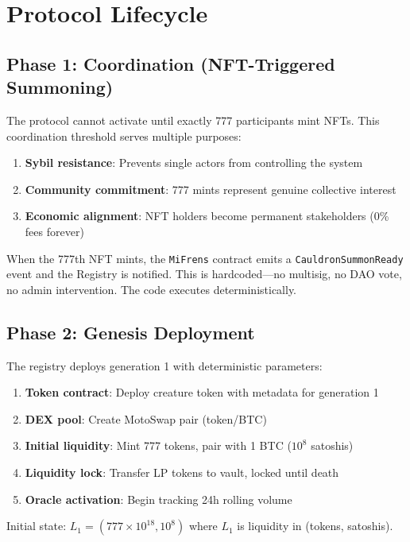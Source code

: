 \documentclass[11pt,a4paper]{article}
\begin{document}
\section{Protocol Lifecycle}

\subsection{Phase 1: Coordination (NFT-Triggered Summoning)}

The protocol cannot activate until exactly 777 participants mint NFTs. This coordination threshold serves multiple purposes:

\begin{enumerate}
    \item \textbf{Sybil resistance}: Prevents single actors from controlling the system
    \item \textbf{Community commitment}: 777 mints represent genuine collective interest
    \item \textbf{Economic alignment}: NFT holders become permanent stakeholders (0\% fees forever)
\end{enumerate}

When the 777th NFT mints, the \texttt{MiFrens} contract emits a \texttt{CauldronSummonReady} event and the Registry is notified. This is hardcoded---no multisig, no DAO vote, no admin intervention. The code executes deterministically.

\subsection{Phase 2: Genesis Deployment}

The registry deploys generation 1 with deterministic parameters:

\begin{enumerate}
    \item \textbf{Token contract}: Deploy creature token with metadata for generation 1
    \item \textbf{DEX pool}: Create MotoSwap pair (token/BTC)
    \item \textbf{Initial liquidity}: Mint 777 tokens, pair with 1 BTC ($10^8$ satoshis)
    \item \textbf{Liquidity lock}: Transfer LP tokens to vault, locked until death
    \item \textbf{Oracle activation}: Begin tracking 24h rolling volume
\end{enumerate}

Initial state: $L_1 = (777 \times 10^{18}, 10^8)$ where $L_1$ is liquidity in (tokens, satoshis).
\end{document}
